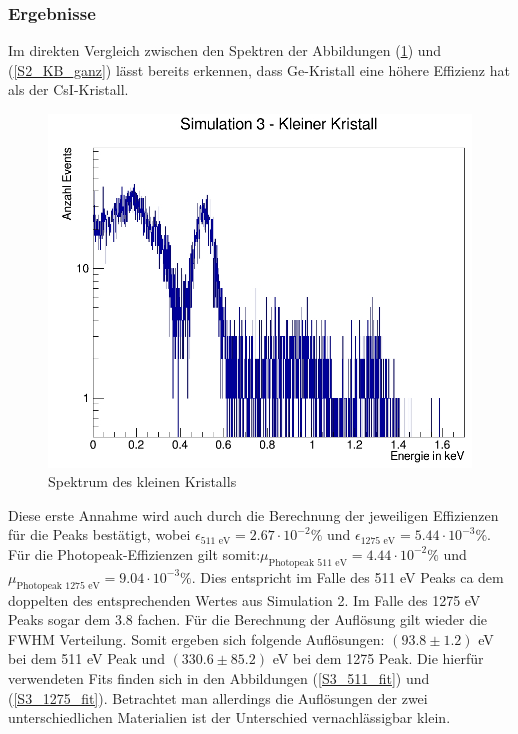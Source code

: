 \documentclass[a4paper,14pt,twoside]{article}
\begin{document}
			
		\subsubsection{Ergebnisse}
			Im direkten Vergleich zwischen den Spektren der Abbildungen (\ref{S3_ganz}) und (\ref{S2_KB_ganz}) lässt bereits erkennen, dass Ge-Kristall eine höhere Effizienz hat als der CsI-Kristall.
			
			\begin{figure}[H]
				\begin{center}
				\includegraphics[width=0.7\linewidth]{Simulation3(KB)_ganz}
				\caption{Spektrum des kleinen Kristalls}
				\label{S3_ganz}
				\end{center}
			\end{figure}
			
			Diese erste Annahme wird auch durch die Berechnung der jeweiligen Effizienzen für die Peaks bestätigt, wobei $\epsilon_\textrm{511 eV}=2.67\cdot 10^{-2}\%$ und $\epsilon_\textrm{1275 eV}=5.44\cdot 10^{-3}\%$.  Für die Photopeak-Effizienzen gilt somit:$\mu_\textrm{Photopeak 511 eV}=4.44\cdot 10^{-2}\%$ und $\mu_\textrm{Photopeak 1275 eV}=9.04\cdot 10^{-3}\%$. Dies entspricht im Falle des 511 eV Peaks ca dem doppelten des entsprechenden Wertes aus Simulation 2. Im Falle des 1275 eV Peaks sogar dem 3.8 fachen. Für die Berechnung der Auflösung gilt wieder die FWHM Verteilung. Somit ergeben sich folgende Auflösungen: $(93.8\pm 1.2)$ eV bei dem 511 eV Peak und $(330.6\pm 85.2)$ eV bei dem 1275 Peak. Die hierfür verwendeten Fits finden sich in den Abbildungen (\ref{S3_511_fit}) und (\ref{S3_1275_fit}). Betrachtet man allerdings die Auflösungen der zwei unterschiedlichen Materialien ist der Unterschied vernachlässigbar klein. 
			
\end{document}
